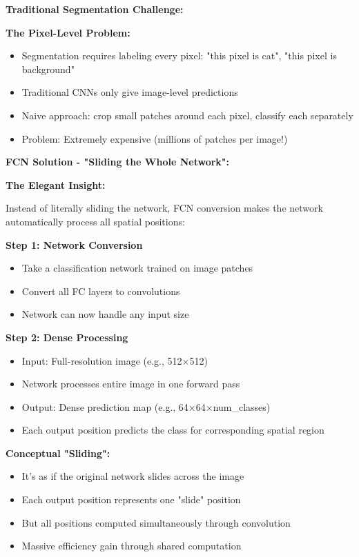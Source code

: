 \documentclass[12pt]{article}
\newcommand{\explanation}[1]{{\color{explanationcolor}#1}}
\begin{document}
\begin{enumerate}[(a)]
{    \textbf{Traditional Segmentation Challenge:}
    
    \explanation{
    \textbf{The Pixel-Level Problem:}
    \begin{itemize}
        \item Segmentation requires labeling every pixel: "this pixel is cat", "this pixel is background"
        \item Traditional CNNs only give image-level predictions
        \item Naive approach: crop small patches around each pixel, classify each separately
        \item Problem: Extremely expensive (millions of patches per image!)
    \end{itemize}
    }
    
    \textbf{FCN Solution - "Sliding the Whole Network":}
    
    \explanation{
    \textbf{The Elegant Insight:}
    
    Instead of literally sliding the network, FCN conversion makes the network automatically process all spatial positions:
    
    \textbf{Step 1: Network Conversion}
    \begin{itemize}
        \item Take a classification network trained on image patches
        \item Convert all FC layers to convolutions
        \item Network can now handle any input size
    \end{itemize}
    
    \textbf{Step 2: Dense Processing}
    \begin{itemize}
        \item Input: Full-resolution image (e.g., 512×512)
        \item Network processes entire image in one forward pass
        \item Output: Dense prediction map (e.g., 64×64×num_classes)
        \item Each output position predicts the class for corresponding spatial region
    \end{itemize}
    
    \textbf{Conceptual "Sliding":}
    \begin{itemize}
        \item It's as if the original network slides across the image
        \item Each output position represents one "slide" position
        \item But all positions computed simultaneously through convolution
        \item Massive efficiency gain through shared computation
    \end{itemize}
    }
    
}
\end{enumerate}
\end{document}
